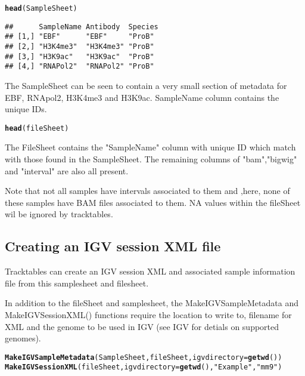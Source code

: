 \documentclass[12pt]{article}\usepackage[]{graphicx}\usepackage[usenames,dvipsnames]{color}
\makeatletter
\newcommand{\hlstr}[1]{\textcolor[rgb]{0.192,0.494,0.8}{#1}}%
\newcommand{\hlstd}[1]{\textcolor[rgb]{0.345,0.345,0.345}{#1}}%
\newcommand{\hlkwc}[1]{\textcolor[rgb]{0.333,0.667,0.333}{#1}}%
\newcommand{\hlkwd}[1]{\textcolor[rgb]{0.737,0.353,0.396}{\textbf{#1}}}%
\newenvironment{kframe}{%
 \def\at@end@of@kframe{}%
 \ifinner\ifhmode%
  \def\at@end@of@kframe{\end{minipage}}%
  \begin{minipage}{\columnwidth}%
 \fi\fi%
 \def\FrameCommand##1{\hskip\@totalleftmargin \hskip-\fboxsep
 \colorbox{shadecolor}{##1}\hskip-\fboxsep
     \hskip-\linewidth \hskip-\@totalleftmargin \hskip\columnwidth}%
 \MakeFramed {\advance\hsize-\width
   \@totalleftmargin\z@ \linewidth\hsize
   \@setminipage}}%
 {\par\unskip\endMakeFramed%
 \at@end@of@kframe}
\newenvironment{knitrout}{}{} %
\makeatother
\begin{document}
\begin{knitrout}
\color{fgcolor}\begin{kframe}
\begin{alltt}
\hlkwd{head}\hlstd{(SampleSheet)}
\end{alltt}
\begin{verbatim}
##      SampleName Antibody  Species
## [1,] "EBF"      "EBF"     "ProB" 
## [2,] "H3K4me3"  "H3K4me3" "ProB" 
## [3,] "H3K9ac"   "H3K9ac"  "ProB" 
## [4,] "RNAPol2"  "RNAPol2" "ProB"
\end{verbatim}
\end{kframe}
\end{knitrout}

The SampleSheet can be seen to contain a very small section of metadata for EBF, RNApol2, H3K4me3 and H3K9ac. SampleName column contains the unique IDs.
\begin{knitrout}
\color{fgcolor}\begin{kframe}
\begin{alltt}
\hlkwd{head}\hlstd{(fileSheet)}
\end{alltt}
\end{kframe}
\end{knitrout}
The FileSheet contains the "SampleName" column with unique ID which match with those found in the SampleSheet. The remaining columns of "bam","bigwig" and "interval" are also all present.

Note that not all samples have intervals associated to them and ,here, none of these samples have BAM files associated to them. NA values within the fileSheet wil be ignored by tracktables.

\subsection{Creating an IGV session XML file}

Tracktables can create an IGV session XML and associated sample information file from this samplesheet and filesheet.

In addition to the fileSheet and samplesheet, the MakeIGVSampleMetadata and MakeIGVSessionXML() functions require the location to write to, filename for XML and the genome to be used in IGV (see IGV for detials on supported genomes).

\begin{knitrout}
\color{fgcolor}\begin{kframe}
\begin{alltt}
\hlkwd{MakeIGVSampleMetadata}\hlstd{(SampleSheet,fileSheet,}\hlkwc{igvdirectory}\hlstd{=}\hlkwd{getwd}\hlstd{())}
\hlkwd{MakeIGVSessionXML}\hlstd{(fileSheet,}\hlkwc{igvdirectory}\hlstd{=}\hlkwd{getwd}\hlstd{(),}\hlstr{"Example"}\hlstd{,}\hlstr{"mm9"}\hlstd{)}
\end{alltt}
\end{kframe}
\end{knitrout}
\end{document}
